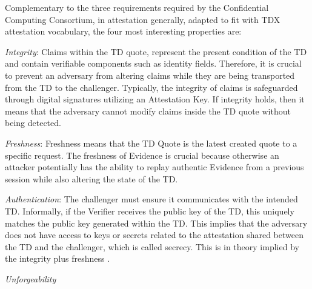 Complementary to the three requirements required by the Confidential Computing Consortium, in attestation generally, adapted to fit with TDX attestation vocabulary, the four most interesting properties are: \cite{sardar_demystifying_2021}

\label{FourProperties}
\textit{Integrity}: Claims within the TD quote, represent the present condition of the TD and contain verifiable components such as identity fields. Therefore, it is crucial to prevent an adversary from altering claims while they are being transported from the TD to the challenger. Typically, the integrity of claims is safeguarded through digital signatures utilizing an Attestation Key. If integrity holds, then it means that the adversary cannot modify claims inside the TD quote without being detected.

\textit{Freshness}: Freshness means that the TD Quote is the latest created quote to a specific request. The freshness of Evidence is crucial because otherwise an attacker potentially has the ability to replay authentic Evidence from a previous session while also altering the state of the TD.


\textit{Authentication}: The challenger must ensure it communicates with the intended TD. Informally, if the Verifier receives the public key of the TD, this uniquely matches the public key generated within the TD. This implies that the adversary does not have access to keys or secrets related to the attestation shared between the TD and the challenger, which is called secrecy. This is in theory implied by the integrity plus freshness \cite{ross_anderson_security_nodate}.

\textit{Unforgeability} \todo


